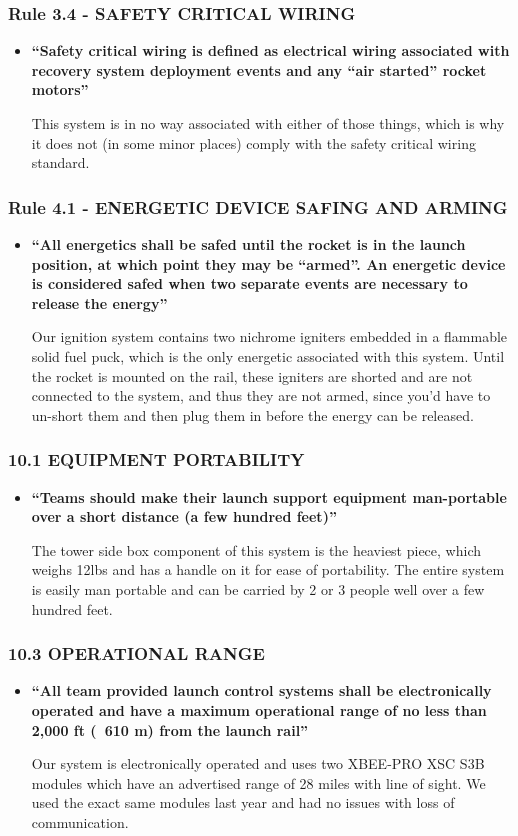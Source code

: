 \documentclass[letter]{article}
\begin{document}
\subsubsection{Rule 3.4 - SAFETY CRITICAL WIRING}
\begin{itemize}
\item {\bfseries ``Safety critical wiring is defined as electrical wiring associated with recovery system
deployment events and any ``air started'' rocket motors''}

This system is in no way associated with either of those things, which is why
it does not (in some minor places) comply with the safety critical wiring
standard.
\end{itemize}
\subsubsection{Rule 4.1 - ENERGETIC DEVICE SAFING AND ARMING}
\begin{itemize}
\item {\bfseries ``All energetics shall be safed until the rocket is in the launch position, at which point they may be ``armed''. An energetic
device is considered safed when two separate events are necessary to release the energy''}

Our ignition system contains two nichrome igniters embedded in a flammable solid
fuel puck, which is the only energetic associated with this system. Until the
rocket is mounted on the rail, these igniters are shorted and are not connected
to the system, and thus they are not armed, since you'd have to un-short them and
then plug them in before the energy can be released.
\end{itemize}
\subsubsection{10.1 EQUIPMENT PORTABILITY}
\begin{itemize}
\item {\bfseries ``Teams should make their launch support equipment man-portable over a short distance (a few
hundred feet)''}

The tower side box component of this system is the heaviest piece, which weighs
12lbs and has a handle on it for ease of portability. The entire system is
easily man portable and can be carried by 2 or 3 people well over a few hundred
feet.
\end{itemize}
\subsubsection{10.3 OPERATIONAL RANGE}
\begin{itemize}
\item {\bfseries ``All team provided launch control systems shall be electronically operated and have a maximum operational range of
no less than 2,000 ft (~610 m) from the launch rail''}

Our system is electronically operated and uses two XBEE-PRO XSC S3B modules
which have an advertised range of 28 miles with line of sight. We used the
exact same modules last year and had no issues with loss of communication.
\end{itemize}
\end{document}
